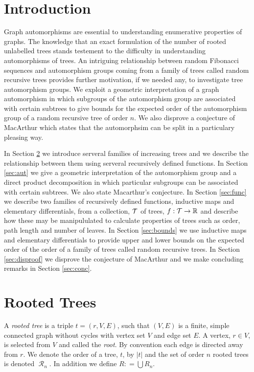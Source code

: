 
\DeclareMathOperator{\F}{\mathcal{F}}
\DeclareMathOperator{\R}{\mathcal{R}}
\DeclareMathOperator{\La}{\mathcal{L}}
\DeclareMathOperator{\V}{\mathcal{V}}
\DeclareMathOperator{\Aut}{Aut}
\usepackage{amssymb}

\section{Introduction}
Graph automorphisms are essential to understanding enumerative properties of graphs.  The knowledge that an exact formulation of 
the number of rooted unlabelled trees stands testement to the difficulty in understanding automorphisms of trees.  An intriguing 
relationship between random Fibonacci sequences and automorphism groups coming from a family of trees called random recursive trees 
provides further motivation, if we needed any, to investigate tree automorphism groups.  We exploit a geometric interpretation of 
a graph automorphism in which subgroups of the automorphism group are associated with certain subtrees to give bounds for the 
expected order of the automorphism group of a random recursive tree of order $n$. We also disprove a conjecture of MacArthur 
\cite{} which states that the automorphsim can be split in a particulary pleasing way.

In Section \ref{sec:RootedTrees} we introduce serveral families of increasing trees and we describe the relationship between them 
using serveral recursively defined functions.  In Section \ref{sec:aut} we give a geometric interpretation of the automorphism group and a 
direct product decomposition in which particular subgroups can be associated with certain subtrees. We also state Macarthur's conjecture.  
In Section \ref{sec:func} we describe two families of recursively defined functions, inductive maps and elementary differentials, from a collection, $\operatorname{\mathcal{T}}$ of trees,  
$f:\operatorname{\mathcal{T}} \rightarrow \mathbb{R}$ and describe how these may be manipululated to calculate properties of trees such as order, path length and 
number of leaves.  In Section \ref{sec:bounds} we use inductive maps and elementary differentials to provide upper and lower bounds on the 
expected order of the order of a family of trees called random recursive trees.  In Section \ref{sec:disproof}  we disprove the conjecture 
of MacArthur and we make concluding remarks in Section \ref{sec:conc}.  


\section{Rooted Trees}\label{sec:RootedTrees}
 A \emph{rooted tree} is a triple $t = (r,V,E)$, such that $(V,E)$ is a finite, simple connected graph without cycles with 
 vertex set $V$ and edge set $E$. A vertex, $r \in V$, is selected from $V$ and called the \emph{root}. By convention each edge is directed away from $r$.  We denote the
 order of a tree, $t$, by $\lvert t \rvert$ and the set of order $n$ rooted trees is denoted $\R_n$.  In addition we define 
 $R : = \bigcup R_n$.
 
